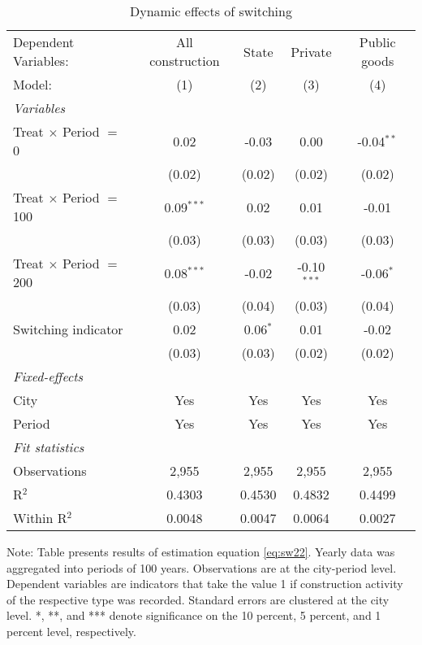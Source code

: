 \begin{table}[htbp]
   \caption{\label{tab:SW22_replication_100y} Dynamic effects of switching}
   \centering
   \begin{tabular}{lcccc}
      \tabularnewline \midrule \midrule
      Dependent Variables:           & All construction & State      & Private       & Public goods\\  
      Model:                         & (1)              & (2)        & (3)           & (4)\\  
      \midrule
      \emph{Variables}\\
      Treat $\times$ Period $=$ 0    & 0.02             & -0.03      & 0.00          & -0.04$^{**}$\\   
                                     & (0.02)           & (0.02)     & (0.02)        & (0.02)\\   
      Treat $\times$ Period $=$ 100  & 0.09$^{***}$     & 0.02       & 0.01          & -0.01\\   
                                     & (0.03)           & (0.03)     & (0.03)        & (0.03)\\   
      Treat $\times$ Period $=$ 200  & 0.08$^{***}$     & -0.02      & -0.10$^{***}$ & -0.06$^{*}$\\   
                                     & (0.03)           & (0.04)     & (0.03)        & (0.04)\\   
      Switching indicator            & 0.02             & 0.06$^{*}$ & 0.01          & -0.02\\   
                                     & (0.03)           & (0.03)     & (0.02)        & (0.02)\\   
      \midrule
      \emph{Fixed-effects}\\
      City                           & Yes              & Yes        & Yes           & Yes\\  
      Period                         & Yes              & Yes        & Yes           & Yes\\  
      \midrule
      \emph{Fit statistics}\\
      Observations                   & 2,955            & 2,955      & 2,955         & 2,955\\  
      R$^2$                          & 0.4303           & 0.4530     & 0.4832        & 0.4499\\  
      Within R$^2$                   & 0.0048           & 0.0047     & 0.0064        & 0.0027\\  
      \midrule \midrule
      
      
   \end{tabular}
   
   \par \raggedright 
   Note: Table presents results of estimation equation \eqref{eq:sw22}. Yearly data was aggregated into periods of 100 years. Observations are at the city-period  level. Dependent variables are indicators that take the value 1 if  construction activity of the respective type was recorded. Standard errors are  clustered at the city level. *, **, and *** denote significance on the 10 percent, 5 percent, and 1 percent  level, respectively.
\end{table}
